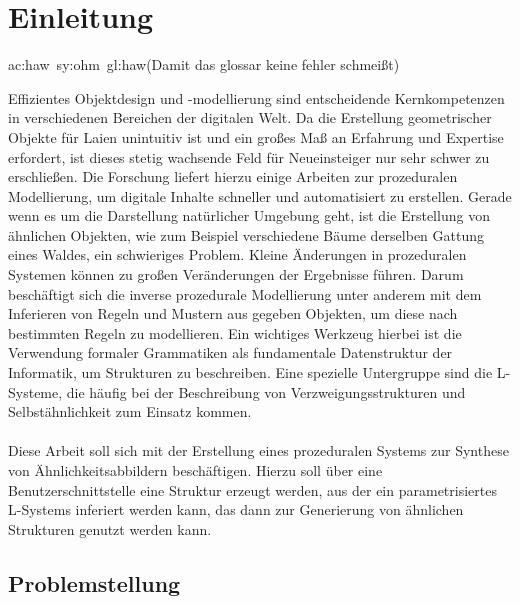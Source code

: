 
\chapter{Einleitung}

\gls{ac:haw}~\gls{sy:ohm}~\gls{gl:haw}(Damit das glossar keine fehler schmeißt)

Effizientes Objektdesign und -modellierung sind entscheidende Kernkompetenzen in verschiedenen Bereichen der
digitalen Welt.
Da die Erstellung geometrischer Objekte für Laien unintuitiv ist und ein großes Maß an Erfahrung und Expertise
erfordert, ist dieses stetig wachsende Feld für Neueinsteiger nur sehr schwer zu erschließen.
Die Forschung liefert hierzu einige Arbeiten zur prozeduralen Modellierung, um digitale Inhalte schneller
und automatisiert zu erstellen.
Gerade wenn es um die Darstellung natürlicher Umgebung geht, ist die Erstellung von ähnlichen Objekten, wie
zum Beispiel verschiedene Bäume derselben Gattung eines Waldes, ein schwieriges Problem.
Kleine Änderungen in prozeduralen Systemen können zu großen Veränderungen der Ergebnisse führen.
Darum beschäftigt sich die inverse prozedurale Modellierung unter anderem mit dem Inferieren von Regeln
und Mustern aus gegeben Objekten, um diese nach bestimmten Regeln zu modellieren.
Ein wichtiges Werkzeug hierbei ist die Verwendung formaler Grammatiken als fundamentale Datenstruktur
der Informatik, um Strukturen zu beschreiben.
Eine spezielle Untergruppe sind die L-Systeme, die häufig bei der Beschreibung
von Verzweigungsstrukturen und Selbstähnlichkeit zum Einsatz kommen.
\\~\\
Diese Arbeit soll sich mit der Erstellung eines prozeduralen Systems zur Synthese von Ähnlichkeitsabbildern
beschäftigen.
Hierzu soll über eine Benutzerschnittstelle eine Struktur erzeugt werden, aus der ein parametrisiertes L-Systems
inferiert werden kann, das dann zur Generierung von ähnlichen Strukturen genutzt werden kann.

\newpage

\section{Problemstellung}

